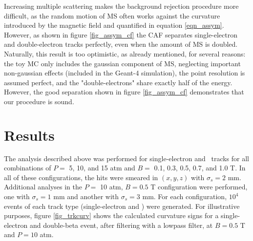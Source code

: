 \documentclass{JINST}
\begin{document}
Increasing multiple scattering  makes the background rejection procedure more difficult, as the random motion
of MS often works against the curvature introduced by the magnetic field and quantified in
equation \ref{eqn_assym}. However, as shown in figure \ref{fig_assym_cf} the CAF separates single-electron and double-electron tracks perfectly, even when the amount of MS is doubled. Naturally, this result is too optimistic, as already mentioned, for several reasons: the toy MC only includes the gaussian component of MS, neglecting important non-gaussian effects (included in the Geant-4 simulation), the point resolution is assumed perfect, and the "double-electrons" share exactly half of the energy. However, the good separation shown in figure \ref{fig_assym_cf} demonstrates that our procedure is sound. 

\section{Results}\label{sec:results}

The analysis described above was performed for single-electron and
\bbonu\ tracks for all combinations of $P =$ 5, 10, and 15 atm and $B =$ 0.1, 0.3, 0.5, 0.7, 
and 1.0 T.  In all of these configurations, the hits were smeared in $(x,y,z)$ with $\sigma_{s} = 2$ mm.  Additional analyses in the $P =$ 10 atm, $B = 0.5$ T configuration were performed, 
one with $\sigma_{s} = 1$ mm and another with $\sigma_{s} = 3$ mm.  For 
each configuration, $10^4$ events of each track type (single-electron and \bbonu) were generated. 
For illustrative purposes, figure \ref{fig_trkcurv} shows the calculated curvature signs for a single-electron and double-beta event, after filtering with a lowpass filter, at $B = 0.5$ T and $P = 10$ atm.  
\end{document}
